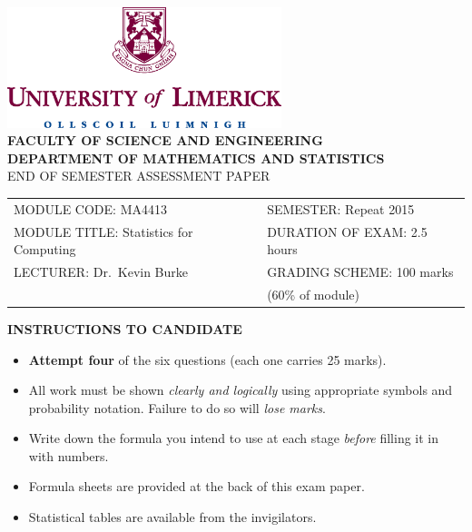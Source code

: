 \documentclass[12pt]{article}
\begin{document}
\begin{center}
\includegraphics[width=0.6\textwidth]{ul_logo}
\quad\\[1cm]
{\bf\large FACULTY OF SCIENCE AND ENGINEERING\\[0.5cm]}
{\bf\small DEPARTMENT OF MATHEMATICS AND STATISTICS\\[0.8cm]}
{\large END OF SEMESTER ASSESSMENT PAPER\\[2cm]}
\begin{adjustwidth}{-1cm}{0cm}
\begin{tabular}{l@{\qquad}l}
MODULE CODE: MA4413&SEMESTER: Repeat 2015\\[1cm]
MODULE TITLE: Statistics for Computing& DURATION OF EXAM: 2.5 hours\\[1cm]
LECTURER: Dr.~Kevin Burke& GRADING SCHEME: 100 marks \\
& \hspace{3cm} (60\% of module)\\[2cm]
\end{tabular}
\end{adjustwidth}
{\bf INSTRUCTIONS TO CANDIDATE}
\end{center}
\begin{small}
\begin{itemize}\itemsep0.3cm
\item {\bf Attempt four} of the six questions (each one carries 25 marks).
\item All work must be shown \emph{clearly and logically} using appropriate symbols and probability notation. Failure to do so will \emph{lose marks}.
\item Write down the formula you intend to use at each stage \emph{before} filling it in with numbers.
\item Formula sheets are provided at the back of this exam paper.
\item Statistical tables are available from the invigilators.
\end{itemize}
\end{small}
\newpage
\end{document}
